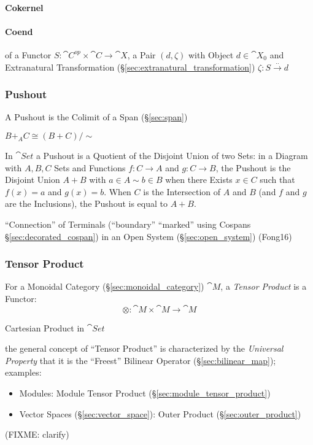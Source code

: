 \paragraph{Cokernel}\label{sec:cokernel}\hfill

\paragraph{Coend}\label{sec:coend}\hfill

of a Functor $S : \cat{C}^{op} \times \cat{C} \rightarrow
\cat{X}$, a Pair $(d, \zeta)$ with Object $d \in \cat{X}_0$ and
Extranatural Transformation (\S\ref{sec:extranatural_transformation})
$\zeta : S \xrightarrow{..} d$



\subsubsection{Pushout}\label{sec:pushout}

A Pushout is the Colimit of a Span (\S\ref{sec:span})

$B +_A C \cong (B + C)/\sim$

In $\cat{Set}$ a Pushout is a Quotient of the Disjoint Union of two
Sets: in a Diagram with $A,B,C$ Sets and Functions $f : C \rightarrow
A$ and $g : C \rightarrow B$, the Pushout is the Disjoint Union $A +
B$ with $a \in A \sim b \in B$ when there Exists $x \in C$ such that
$f(x) = a$ and $g(x) = b$. When $C$ is the Intersection of $A$ and $B$
(and $f$ and $g$ are the Inclusions), the Pushout is equal to $A + B$.

\fist ``Connection'' of Terminals (``boundary'' ``marked'' using
Cospans \S\ref{sec:decorated_cospan}) in an Open System
(\S\ref{sec:open_system}) (Fong16)



\subsubsection{Tensor Product}\label{sec:tensor_product}

For a Monoidal Category (\S\ref{sec:monoidal_category}) $\cat{M}$,
a \emph{Tensor Product} is a Functor:
\[
  \otimes : \cat{M} \times \cat{M} \rightarrow \cat{M}
\]

Cartesian Product in $\cat{Set}$

the general concept of ``Tensor Product'' is characterized by the
\emph{Universal Property} that it is the ``Freest'' Bilinear Operator
(\S\ref{sec:bilinear_map}); examples:
\begin{itemize}
\item Modules: Module Tensor Product (\S\ref{sec:module_tensor_product})
\item Vector Spaces (\S\ref{sec:vector_space}): Outer Product
  (\S\ref{sec:outer_product})
\end{itemize}
(FIXME: clarify)

